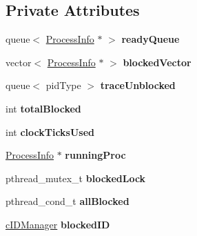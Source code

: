 \subsection*{\-Private \-Attributes}
\begin{DoxyCompactItemize}
\item 
\hypertarget{classcRoundRobin_af8667fa086a7562c2523d5b5cd783d75}{queue$<$ \hyperlink{structProcessInfo}{\-Process\-Info} $\ast$ $>$ {\bfseries ready\-Queue}}\label{dc/dcc/classcRoundRobin_af8667fa086a7562c2523d5b5cd783d75}

\item 
\hypertarget{classcRoundRobin_a2816611cab817668edbeceff1a17ccca}{vector$<$ \hyperlink{structProcessInfo}{\-Process\-Info} $\ast$ $>$ {\bfseries blocked\-Vector}}\label{dc/dcc/classcRoundRobin_a2816611cab817668edbeceff1a17ccca}

\item 
\hypertarget{classcRoundRobin_a39d20da5b1f573e79834e60d1bebaff2}{queue$<$ pid\-Type $>$ {\bfseries trace\-Unblocked}}\label{dc/dcc/classcRoundRobin_a39d20da5b1f573e79834e60d1bebaff2}

\item 
\hypertarget{classcRoundRobin_a2068152f0b3d1592dc031ecf7b0d7d5f}{int {\bfseries total\-Blocked}}\label{dc/dcc/classcRoundRobin_a2068152f0b3d1592dc031ecf7b0d7d5f}

\item 
\hypertarget{classcRoundRobin_a8779f8cb28be168316b485c77d09b210}{int {\bfseries clock\-Ticks\-Used}}\label{dc/dcc/classcRoundRobin_a8779f8cb28be168316b485c77d09b210}

\item 
\hypertarget{classcRoundRobin_a58ea813b29ddc7ca0da1428a1fcb7693}{\hyperlink{structProcessInfo}{\-Process\-Info} $\ast$ {\bfseries running\-Proc}}\label{dc/dcc/classcRoundRobin_a58ea813b29ddc7ca0da1428a1fcb7693}

\item 
\hypertarget{classcRoundRobin_a3b5a8047d5522b85a486f1caeeaca9f6}{pthread\-\_\-mutex\-\_\-t {\bfseries blocked\-Lock}}\label{dc/dcc/classcRoundRobin_a3b5a8047d5522b85a486f1caeeaca9f6}

\item 
\hypertarget{classcRoundRobin_ac9f22c160b4e3cb118723a1e780575ad}{pthread\-\_\-cond\-\_\-t {\bfseries all\-Blocked}}\label{dc/dcc/classcRoundRobin_ac9f22c160b4e3cb118723a1e780575ad}

\item 
\hypertarget{classcRoundRobin_a15ca5ec15a4ae935706b55ac71d6bee2}{\hyperlink{classcIDManager}{c\-I\-D\-Manager} {\bfseries blocked\-I\-D}}\label{dc/dcc/classcRoundRobin_a15ca5ec15a4ae935706b55ac71d6bee2}


\end{DoxyCompactItemize}
